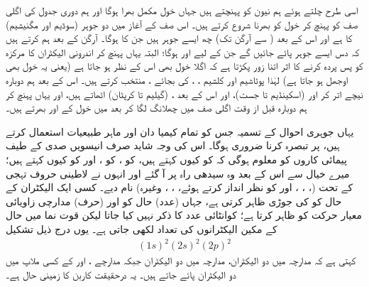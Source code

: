  
 اسی طرح چلتے ہوئے ہم نیون  کو پہنچتے ہیں جہاں  خول مکمل بھرا ہوگا اور ہم دوری جدول کی اگلی صف کو پہنچ کر  خول کو بھرنا شروع کرتے ہیں۔ اس صف کے آغاز میں دو جوہر (سوڈیم اور مگنیشیم) کا  ہے اور اس کے بعد ( سے آرگن تک) چھ ایسے جوہر ہیں جن کا  ہوگا۔ آرگن کے بعد ہم  کرتے ہیں کہ دس ایسے جوہر پائے جائیں گے جن کے لیے  اور  ہوگا؛ البتہ یہاں پہنچ کر اندرونی الیکٹران کا مرکزہ کو پس پردہ کرنے کا اثر اتنا زور پکڑتا ہے کہ اگلا خول بھی اس کے نظر ہو جاتا ہے (یعنی یہ خول بھی اوجھل ہو جاتا ہے) لہٰذا پوٹاشیم  اور کلشیم ، ،  کی
 بجائے ،  منتخب کرتے ہیں۔ اس کے بعد ہم دوبارہ نیچے اتر کر  اور  (اسکینڈیم تا جست)، اور اس کے بعد ، (گیلیم تا کرپٹان) اٹھاتے ہیں، اور یہاں پہنچ کر ہم دوبارہ قبل از وقت اگلی صف  میں چھلانگ لگا کر بعد میں  خول کے  اور  بھرتے ہیں۔
 
 یہاں جوہری احوال کے تسمیہ جس کو تمام کیمیا دان اور ماہر طبیعیات استعمال کرتے ہیں، پر تبصرہ کرنا ضروری ہوگا۔ اس کی وجہ شاید صرف انیسویں صدی کے طیف پیمائی کاروں کو معلوم ہوگی کہ  کو کیوں  کہتے ہیں،  کو ،  کو ، اور  کو کیوں  کہتے ہیں؛ میرے خیال سے اس کے بعد وہ سیدھی راہ پر آ گئے اور انہوں نے لاطینی حروف تہجی کے تحت (، ، ، اور  کو نظر انداز کرتے ہوئے، ، ، وغیرہ) نام دیے۔ کسی ایک الیکٹران کے حال کو  کی جوڑی ظاہر کرتی ہے، جہاں (عدد)  حال کو اور (حرف)  مدارچی زاویائی معیار حرکت کو ظاہر کرتا ہے؛ کوانٹائی عدد  کا ذکر نہیں کیا جاتا لیکن قوت نما میں حال کے مکین الیکٹرانوں کی تعداد لکھی جاتی ہے۔ یوں درج ذیل تشکیل
\begin{align}\label{مساوات_متماثل_الیکٹرانی_تشکیل}
(1s)^{2}(2s)^{2}(2p)^{2} 
\end{align}
کہتی ہے کہ مدارچہ  میں دو الیکٹران، مدارچہ  میں دو الیکٹران جبکہ مدارچے ،  اور  کے کسی ملاپ میں دو الیکٹران پائے جاتے ہیں۔ یہ درحقیقت کاربن کا زمینی حال ہے۔ 


